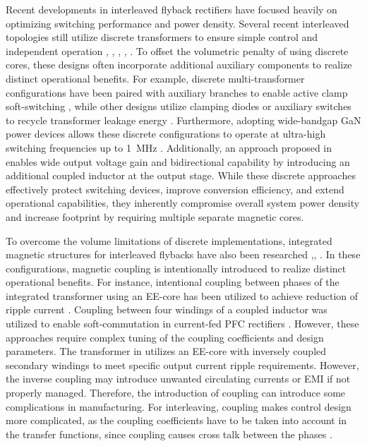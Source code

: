 \documentclass[lettersize,journal]{IEEEtran}
\begin{document}
{\color{red}
Recent developments in interleaved flyback rectifiers have focused heavily on optimizing switching performance and power density. Several recent interleaved topologies still utilize discrete transformers to ensure simple control and independent operation \cite{shi2024}, \cite{cheng2018}, \cite{wu2015}, \cite{cheng2023}, \cite{mayer2025}. To offset the volumetric penalty of using discrete cores, these designs often incorporate additional auxiliary components to realize distinct operational benefits. For example, discrete multi-transformer configurations have been paired with auxiliary branches to enable active clamp soft-switching \cite{shi2024}, while other designs utilize clamping diodes or auxiliary switches to recycle transformer leakage energy \cite{cheng2018, wu2015}. Furthermore, adopting wide-bandgap GaN power devices allows these discrete configurations to operate at ultra-high switching frequencies up to 1~MHz \cite{cheng2023}. Additionally, an approach proposed in \cite{mayer2025} enables wide output voltage gain and bidirectional capability by introducing an additional coupled inductor at the output stage. While these discrete approaches effectively protect switching devices, improve conversion efficiency, and extend operational capabilities, they inherently compromise overall system power density and increase footprint by requiring multiple separate magnetic cores.

To overcome the volume limitations of discrete implementations, integrated magnetic structures for interleaved flybacks have also been researched \cite{ishihara2015},\cite{tonolo2025}, \cite{qian2008}. In these configurations, magnetic coupling is intentionally introduced to realize distinct operational benefits. For instance, intentional coupling between phases of the integrated transformer using an EE-core has been utilized to achieve reduction of ripple current \cite{ishihara2015}. Coupling between four windings of a coupled inductor was utilized to enable soft-commutation in current-fed PFC rectifiers \cite{tonolo2025}. However, these approaches require complex tuning of the coupling coefficients and design parameters. The transformer in \cite{qian2008} utilizes an EE-core with inversely coupled secondary windings to meet specific output current ripple requirements. However, the inverse coupling may introduce unwanted circulating currents or EMI if not properly managed. Therefore, the introduction of coupling can introduce some complications in manufacturing. For interleaving, coupling makes control design more complicated, as the coupling coefficients have to be taken into account in the transfer functions, since coupling causes cross talk between the phases \cite{Mao_2011}.} 
\end{document}

